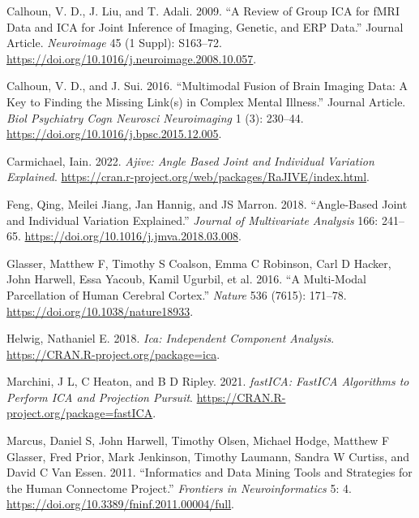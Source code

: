\begin{CSLReferences}{1}{0}
\leavevmode{}%
Calhoun, V. D., J. Liu, and T. Adali. 2009. {``A Review of Group ICA for fMRI Data and ICA for Joint Inference of Imaging, Genetic, and ERP Data.''} Journal Article. \emph{Neuroimage} 45 (1 Suppl): S163--72. \url{https://doi.org/10.1016/j.neuroimage.2008.10.057}.

\leavevmode{}%
Calhoun, V. D., and J. Sui. 2016. {``Multimodal Fusion of Brain Imaging Data: A Key to Finding the Missing Link(s) in Complex Mental Illness.''} Journal Article. \emph{Biol Psychiatry Cogn Neurosci Neuroimaging} 1 (3): 230--44. \url{https://doi.org/10.1016/j.bpsc.2015.12.005}.

\leavevmode{}%
Carmichael, Iain. 2022. \emph{Ajive: Angle Based Joint and Individual Variation Explained}. \url{https://cran.r-project.org/web/packages/RaJIVE/index.html}.

\leavevmode{}%
Feng, Qing, Meilei Jiang, Jan Hannig, and JS Marron. 2018. {``Angle-Based Joint and Individual Variation Explained.''} \emph{Journal of Multivariate Analysis} 166: 241--65. \url{https://doi.org/10.1016/j.jmva.2018.03.008}.

\leavevmode{}%
Glasser, Matthew F, Timothy S Coalson, Emma C Robinson, Carl D Hacker, John Harwell, Essa Yacoub, Kamil Ugurbil, et al. 2016. {``A Multi-Modal Parcellation of Human Cerebral Cortex.''} \emph{Nature} 536 (7615): 171--78. \url{https://doi.org/10.1038/nature18933}.

\leavevmode{}%
Helwig, Nathaniel E. 2018. \emph{Ica: Independent Component Analysis}. \url{https://CRAN.R-project.org/package=ica}.

\leavevmode{}%
Marchini, J L, C Heaton, and B D Ripley. 2021. \emph{fastICA: FastICA Algorithms to Perform ICA and Projection Pursuit}. \url{https://CRAN.R-project.org/package=fastICA}.

\leavevmode{}%
Marcus, Daniel S, John Harwell, Timothy Olsen, Michael Hodge, Matthew F Glasser, Fred Prior, Mark Jenkinson, Timothy Laumann, Sandra W Curtiss, and David C Van Essen. 2011. {``Informatics and Data Mining Tools and Strategies for the Human Connectome Project.''} \emph{Frontiers in Neuroinformatics} 5: 4. \url{https://doi.org/10.3389/fninf.2011.00004/full}.


\end{CSLReferences}
